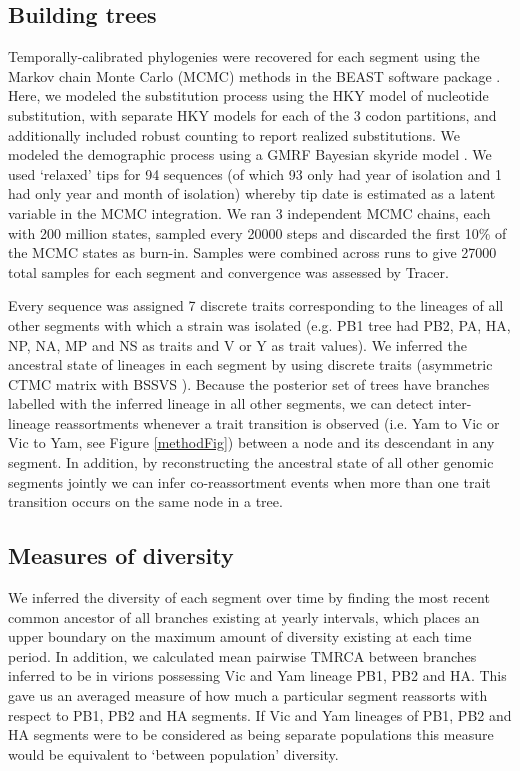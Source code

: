 \documentclass[11pt,oneside,letterpaper]{article}
\begin{document}
\subsection*{Building trees}
Temporally-calibrated phylogenies were recovered for each segment using the Markov chain Monte Carlo (MCMC) methods in the BEAST software package \cite{drummond2012}.
Here, we modeled the substitution process using the HKY model of nucleotide substitution, with separate HKY models for each of the 3 codon partitions, and additionally included robust counting \cite{obrien2009} to report realized substitutions.
We modeled the demographic process using a GMRF Bayesian skyride model \cite{minin2008}.
We used `relaxed' tips for 94 sequences (of which 93 only had year of isolation and 1 had only year and month of isolation) whereby tip date is estimated as a latent variable in the MCMC integration.
We ran 3 independent MCMC chains, each with 200 million states, sampled every 20000 steps and discarded the first 10\% of the MCMC states as burn-in.
Samples were combined across runs to give 27000 total samples for each segment and convergence was assessed by Tracer.

Every sequence was assigned 7 discrete traits corresponding to the lineages of all other segments with which a strain was isolated (e.g. PB1 tree had PB2, PA, HA, NP, NA, MP and NS as traits and V or Y as trait values).
We inferred the ancestral state of lineages in each segment by using discrete traits (asymmetric CTMC matrix with BSSVS \cite{lemey2009}). Because the posterior set of trees have branches labelled with the inferred lineage in all other segments, we can detect inter-lineage reassortments whenever a trait transition is observed (i.e. Yam to Vic or Vic to Yam, see Figure \ref{methodFig}) between a node and its descendant in any segment. 
In addition, by reconstructing the ancestral state of all other genomic segments jointly we can infer co-reassortment events when more than one trait transition occurs on the same node in a tree.

\subsection*{Measures of diversity}
We inferred the diversity of each segment over time by finding the most recent common ancestor of all branches existing at yearly intervals, which places an upper boundary on the maximum amount of diversity existing at each time period.
In addition, we calculated mean pairwise TMRCA between branches inferred to be in virions possessing Vic and Yam lineage PB1, PB2 and HA.
This gave us an averaged measure of how much a particular segment reassorts with respect to PB1, PB2 and HA segments.
If Vic and Yam lineages of PB1, PB2 and HA segments were to be considered as being separate populations this measure would be equivalent to `between population' diversity.
\end{document}
